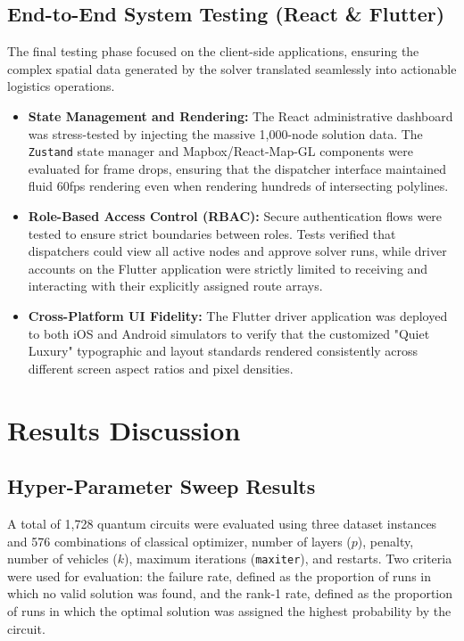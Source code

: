 \documentclass[a4paper]{report}
\begin{document}
{\begin{itemize}
\begin{itemize}
\subsection{End-to-End System Testing (React \& Flutter)}

The final testing phase focused on the client-side applications, ensuring the complex spatial data generated by the solver translated seamlessly into actionable logistics operations.

\begin{itemize}
    \item \textbf{State Management and Rendering:} The React administrative dashboard was stress-tested by injecting the massive 1,000-node solution data. The \texttt{Zustand} state manager and Mapbox/React-Map-GL components were evaluated for frame drops, ensuring that the dispatcher interface maintained fluid 60fps rendering even when rendering hundreds of intersecting polylines.
    \item \textbf{Role-Based Access Control (RBAC):} Secure authentication flows were tested to ensure strict boundaries between roles. Tests verified that dispatchers could view all active nodes and approve solver runs, while driver accounts on the Flutter application were strictly limited to receiving and interacting with their explicitly assigned route arrays.
    \item \textbf{Cross-Platform UI Fidelity:} The Flutter driver application was deployed to both iOS and Android simulators to verify that the customized "Quiet Luxury" typographic and layout standards rendered consistently across different screen aspect ratios and pixel densities.
\end{itemize}
\section{Results Discussion }\subsection{Hyper-Parameter Sweep Results}
\label{sec:hyperparameter-results}

A total of 1,728 quantum circuits were evaluated using three dataset instances and 
576 combinations of classical optimizer, number of layers ($p$), penalty, number 
of vehicles ($k$), maximum iterations (\texttt{maxiter}), and restarts. Two 
criteria were used for evaluation: the failure rate, defined as the proportion of 
runs in which no valid solution was found, and the rank-1 rate, defined as the 
proportion of runs in which the optimal solution was assigned the highest 
probability by the circuit.


\end{itemize}
\end{itemize}}
\end{document}
